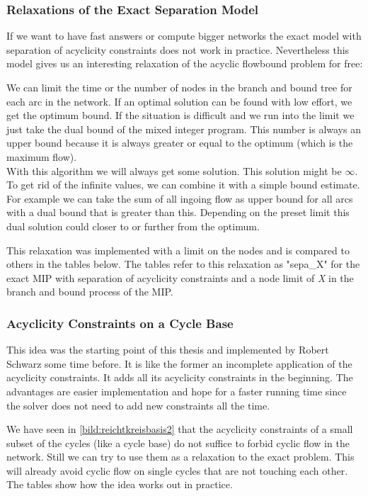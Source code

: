 \subsubsection{Relaxations of the Exact Separation Model}
If we want to have fast answers or compute bigger networks the exact model with separation of acyclicity 
constraints does not work in practice. Nevertheless this model gives us an interesting relaxation of the acyclic 
flowbound problem for free: 

We can limit the time or the number of nodes in the branch and bound tree for each arc in the network. If an optimal 
solution can be found with low effort, we get the optimum bound. If the situation is difficult and we run into the limit 
we just take the dual bound of the mixed integer program. This number is always an upper bound because it is always 
greater or equal to the optimum (which is the maximum flow). \\

With this algorithm we will always get some solution. This solution might be $\infty$. To get rid of the infinite 
values, we can combine it with a simple bound estimate. For example we can take the sum of all ingoing flow as upper 
bound for all arcs with a dual bound that is greater than this. Depending on the preset limit this dual solution could
closer to or further from the optimum. 

This relaxation was implemented with a limit on the nodes and is compared to 
others in the tables below. The tables refer to this relaxation as "sepa\_X" for the exact MIP with separation of 
acyclicity constraints and a node limit of \textit{X} in the branch and bound process of the MIP.

\subsubsection{Acyclicity Constraints on a Cycle Base}%
This idea was the starting point of this thesis and implemented by Robert Schwarz some time before. It is like the 
former an incomplete application of the acyclicity constraints. It adds all its acyclicity constraints in the 
beginning. The advantages are easier implementation and hope for a faster running time since the solver does not need 
to add new constraints all the time.

We have seen in \ref{bild:reichtkreisbasis2} that the acyclicity constraints of a small subset of the cycles (like a 
cycle base) do not suffice to forbid cyclic flow  in the network. Still we can try to use them as a relaxation to the 
exact problem. This will already avoid cyclic flow on single cycles that are not touching each other. The tables show 
how the idea works out in practice.

